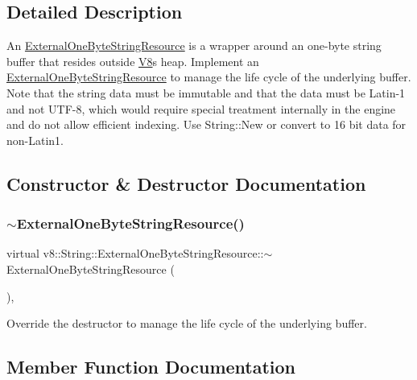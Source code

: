 \subsection{Detailed Description}
An \mbox{\hyperlink{classv8_1_1String_1_1ExternalOneByteStringResource}{External\+One\+Byte\+String\+Resource}} is a wrapper around an one-\/byte string buffer that resides outside \mbox{\hyperlink{classv8_1_1V8}{V8}}\textquotesingle{}s heap. Implement an \mbox{\hyperlink{classv8_1_1String_1_1ExternalOneByteStringResource}{External\+One\+Byte\+String\+Resource}} to manage the life cycle of the underlying buffer. Note that the string data must be immutable and that the data must be Latin-\/1 and not U\+T\+F-\/8, which would require special treatment internally in the engine and do not allow efficient indexing. Use String\+::\+New or convert to 16 bit data for non-\/\+Latin1. 

\subsection{Constructor \& Destructor Documentation}
\mbox{\label{classv8_1_1String_1_1ExternalOneByteStringResource_a443edbb33926b2a9480fe0caac6e95ab}} 
\subsubsection{\texorpdfstring{$\sim$\+External\+One\+Byte\+String\+Resource()}{~ExternalOneByteStringResource()}}
{\footnotesize\ttfamily virtual v8\+::\+String\+::\+External\+One\+Byte\+String\+Resource\+::$\sim$\+External\+One\+Byte\+String\+Resource (\begin{DoxyParamCaption}{ }\end{DoxyParamCaption})\hspace{0.3cm}{\ttfamily [inline]}, {\ttfamily [virtual]}}

Override the destructor to manage the life cycle of the underlying buffer. 

\subsection{Member Function Documentation}
\mbox{\label{classv8_1_1String_1_1ExternalOneByteStringResource_aaeca31240d3dbf990d1b974e3c64593e}} 
